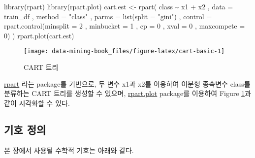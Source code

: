 \documentclass[
]{book}
\newenvironment{Shaded}{\begin{snugshade}}{\end{snugshade}}
\newcommand{\AttributeTok}[1]{\textcolor[rgb]{0.77,0.63,0.00}{#1}}
\newcommand{\DecValTok}[1]{\textcolor[rgb]{0.00,0.00,0.81}{#1}}
\newcommand{\FunctionTok}[1]{\textcolor[rgb]{0.00,0.00,0.00}{#1}}
\newcommand{\NormalTok}[1]{#1}
\newcommand{\OtherTok}[1]{\textcolor[rgb]{0.56,0.35,0.01}{#1}}
\newcommand{\SpecialCharTok}[1]{\textcolor[rgb]{0.00,0.00,0.00}{#1}}
\newcommand{\StringTok}[1]{\textcolor[rgb]{0.31,0.60,0.02}{#1}}
\begin{document}
\begin{Shaded}
\begin{Highlighting}[]
\FunctionTok{library}\NormalTok{(rpart)}
\FunctionTok{library}\NormalTok{(rpart.plot)}
\NormalTok{cart.est }\OtherTok{\textless{}{-}} \FunctionTok{rpart}\NormalTok{(}
\NormalTok{  class }\SpecialCharTok{\textasciitilde{}}\NormalTok{ x1 }\SpecialCharTok{+}\NormalTok{ x2}
\NormalTok{  , }\AttributeTok{data =}\NormalTok{ train\_df}
\NormalTok{  , }\AttributeTok{method =} \StringTok{"class"}
\NormalTok{  , }\AttributeTok{parms =} \FunctionTok{list}\NormalTok{(}\AttributeTok{split =} \StringTok{"gini"}\NormalTok{)}
\NormalTok{  , }\AttributeTok{control =} \FunctionTok{rpart.control}\NormalTok{(}\AttributeTok{minsplit =} \DecValTok{2}
\NormalTok{                            , }\AttributeTok{minbucket =} \DecValTok{1}
\NormalTok{                            , }\AttributeTok{cp =} \DecValTok{0}
\NormalTok{                            , }\AttributeTok{xval =} \DecValTok{0}
\NormalTok{                            , }\AttributeTok{maxcompete =} \DecValTok{0}\NormalTok{)}
\NormalTok{  )}
\FunctionTok{rpart.plot}\NormalTok{(cart.est)}
\end{Highlighting}
\end{Shaded}

\begin{figure}

{\centering \texttt{[image: data-mining-book\_files/figure-latex/cart-basic-1]} 

}

\caption{CART 트리}\label{fig:cart-basic}
\end{figure}

\href{https://cran.r-project.org/web/packages/rpart/}{rpart} 라는 package를 기반으로, 두 변수 x1과 x2를 이용하여 이분형 종속변수 class를 분류하는 CART 트리를 생성할 수 있으며, \href{https://cran.r-project.org/web/packages/rpart.plot/}{rpart.plot} package를 이용하여 Figure \ref{fig:cart-basic}과 같이 시각화할 수 있다.

\hypertarget{cart-notation}{%
\subsection{기호 정의}\label{cart-notation}}

본 장에서 사용될 수학적 기호는 아래와 같다.
\end{document}
